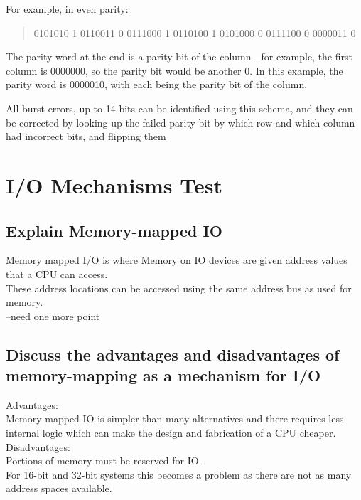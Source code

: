 \documentclass{article}
\begin{document}
For example, in even parity:

\begin{quote}
0101010 1
0110011 0
0111000 1
0110100 1
0101000 0
0111100 0
0000011 0
\end{quote}

The parity word at the end is a parity bit of the column - for example,
the first column is 0000000, so the parity bit would be another 0. In
this example, the parity word is 0000010, with each being the parity bit
of the column.

All burst errors, up to 14 bits can be identified using this schema, and
they can be corrected by looking up the failed parity bit by which row
and which column had incorrect bits, and flipping them











\newpage
\section{I/O Mechanisms Test}
\subsection{Explain Memory-mapped IO}
Memory mapped I/O is where Memory on IO devices are given address values that a CPU can access.\\
These address locations can be accessed using the same address bus as used for memory.\\
--need one more point

\subsection{Discuss the advantages and disadvantages of memory-mapping as a mechanism for I/O}
Advantages:\\
Memory-mapped IO is simpler than many alternatives and there requires less internal logic which can make the design and fabrication of a CPU cheaper.\\
Disadvantages:\\
Portions of memory must be reserved for IO.\\
For 16-bit and 32-bit systems this becomes a problem as there are not as many address spaces available.
\end{document}
